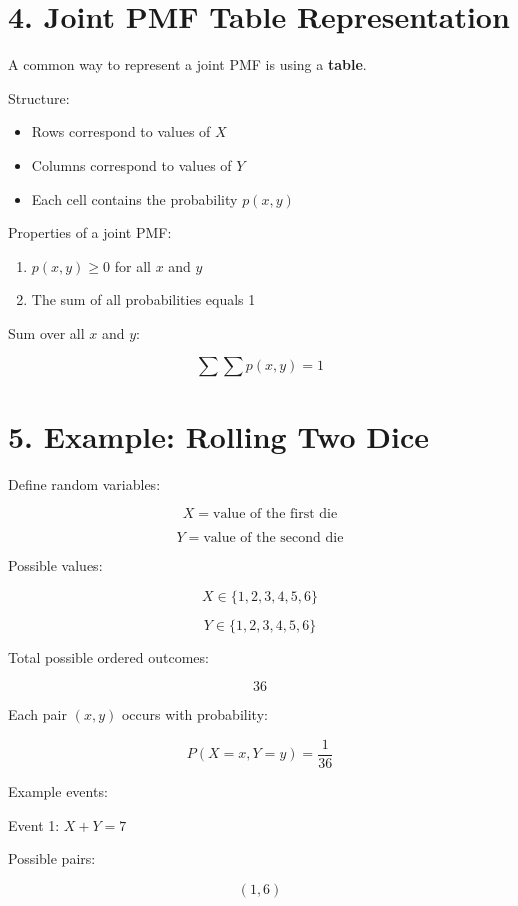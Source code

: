 \documentclass{article}
\begin{document}
\bigskip

\section*{4. Joint PMF Table Representation}

A common way to represent a joint PMF is using a \textbf{table}.

Structure:

\begin{itemize}
\item Rows correspond to values of $X$
\item Columns correspond to values of $Y$
\item Each cell contains the probability $p(x, y)$
\end{itemize}

Properties of a joint PMF:

\begin{enumerate}
\item $p(x, y) \geq 0$ for all $x$ and $y$
\item The sum of all probabilities equals 1
\end{enumerate}

Sum over all $x$ and $y$:

\[
\sum \sum p(x, y) = 1
\]

\bigskip

\section*{5. Example: Rolling Two Dice}

Define random variables:

\[
X = \text{value of the first die}
\]

\[
Y = \text{value of the second die}
\]

Possible values:

\[
X \in \{1,2,3,4,5,6\}
\]

\[
Y \in \{1,2,3,4,5,6\}
\]

Total possible ordered outcomes:

\[
36
\]

Each pair $(x, y)$ occurs with probability:

\[
P(X = x, Y = y) = \frac{1}{36}
\]

Example events:

Event 1: $X + Y = 7$

Possible pairs:

\[
(1,6)
\]
\end{document}
